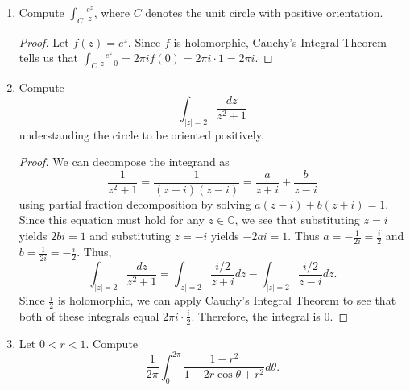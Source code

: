 \documentclass[10pt]{article}
\newcommand{\C}{\mathbb{C}}
\begin{document}
\begin{enumerate}
\begin{proof}
The limit of the integral in (8) as $R \rightarrow \infty$ is 0, which leaves us with
\begin{align*}
\lim\limits_{R \rightarrow \infty} \int_{\Gamma} e^{iz^2}dz &= \int_{\gamma_1} e^{iz^2}dz + \int_{\gamma_2} e^{iz^2}dz + \int_{-\gamma_3} e^{iz^2}dz
\\
&= \int_0^R \cos(x^2) + i\sin(x^2) dx + 0 - \frac{\sqrt{2\pi}}{4}- i\frac{\sqrt{2\pi}}{4}
\\
&= 0.
\end{align*}
Therefore,
$$
\int_0^R \cos(x^2) + i\int_0^R \sin(x^2) dx = \frac{\sqrt{2\pi}}{4}+ i\frac{\sqrt{2\pi}}{4}
$$
Equating the real and imaginary parts gives the desired result.
\end{proof}

\item Compute $\int_{C} \frac{e^z}{z}$, where $C$ denotes the unit circle with positive orientation.

\begin{proof}

Let $f(z) = e^z$.  Since $f$ is holomorphic, Cauchy's Integral Theorem tells us that $\int_{C} \frac{e^z}{z-0} = 2\pi if(0) = 2\pi i\cdot 1 = 2 \pi i$.

\end{proof}

\item Compute $$\int_{|z| = 2} \dfrac{dz}{z^2 + 1}$$ understanding the circle to be oriented positively.

\begin{proof}

We can decompose the integrand as
$$
\frac{1}{z^2 + 1} = \frac{1}{(z+i)(z-i)} = \frac{a}{z+i} + \frac{b}{z-i}
$$
using partial fraction decomposition by solving $a(z-i) + b(z+i) = 1$.  Since this equation must hold for any $z \in \C$, we see that substituting $z = i$ yields $2bi = 1$ and substituting $z = -i$ yields $-2ai = 1$.  Thus $a = -\frac{1}{2i} = \frac{i}{2}$ and $b = \frac{1}{2i} = - \frac{i}{2}$.  Thus,
$$
\int_{|z| = 2} \frac{dz}{z^2 + 1} = \int_{|z| = 2} \frac{i/2}{z + i}dz - \int_{|z| = 2} \frac{i/2}{z - i}dz.
$$
Since $\frac{i}{2}$ is holomorphic, we can apply Cauchy's Integral Theorem to see that both of these integrals equal $2\pi i \cdot \frac{i}{2}$.  Therefore, the integral is $0$.
\end{proof}

\pagebreak
\item Let $0 < r < 1$.  Compute $$\frac{1}{2\pi} \int_0^{2\pi} \dfrac{1-r^2}{1 - 2r \cos \theta + r^2}d \theta.$$


\end{enumerate}
\end{document}
